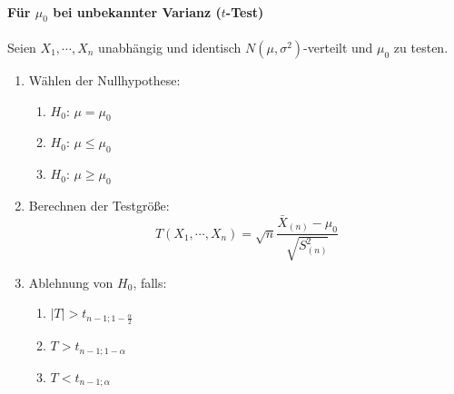 \documentclass[a4paper, 11pt, accentcolor = tud3b]{tudreport}
\newcommand{\abs}[1]{\ensuremath{{\lvert #1 \rvert}}}
\begin{document}
            \paragraph{Für \(\mu_0\) bei unbekannter Varianz (\(t\)-Test)}
	            Seien \( X_1, \cdots, X_n \) unabhängig und identisch \( N(\mu, \sigma^2) \)-verteilt und \(\mu_0\) zu testen.
                \begin{enumerate}
                	\item Wählen der Nullhypothese:
	                	\begin{enumerate}[label = \Alph*)]
	                		\item \( H_0 \): \quad \( \mu = \mu_0 \)
	                		\item \( H_0 \): \quad \( \mu \leq \mu_0 \)
	                		\item \( H_0 \): \quad \( \mu \geq \mu_0 \)
	                	\end{enumerate}
                	\item Berechnen der Testgröße:
	                	\begin{equation*}
		                	T(X_1, \cdots, X_n) = \sqrt{n} \frac{\bar{X}_{(n)} - \mu_0}{\sqrt{S_{(n)}^2}}
	                	\end{equation*}
	                \item Ablehnung von \(H_0\), falls:
		                \begin{enumerate}[label = \Alph*)]
		                	\item \( \abs{T} > t_{n - 1; 1 - \frac{\alpha}{2}} \)
		                	\item \( T > t_{n - 1; 1 - \alpha} \)
		                	\item \( T < t_{n - 1; \alpha} \)
		                \end{enumerate}
                \end{enumerate}
\end{document}
